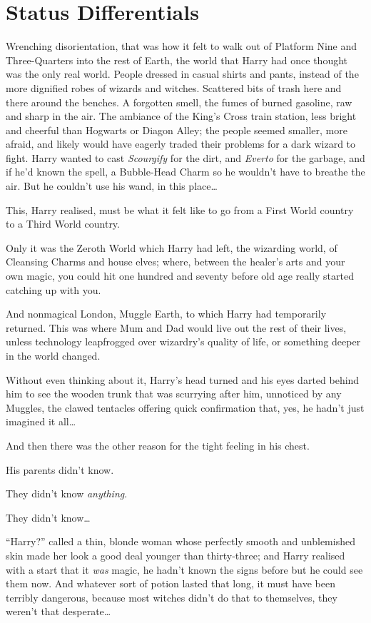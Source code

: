\chapter{Status Differentials}

Wrenching disorientation, that was how it felt to walk out of Platform
Nine and Three-Quarters into the rest of Earth, the world that Harry had
once thought was the only real world. People dressed in casual shirts
and pants, instead of the more dignified robes of wizards and witches.
Scattered bits of trash here and there around the benches. A forgotten
smell, the fumes of burned gasoline, raw and sharp in the air. The
ambiance of the King's Cross train station, less bright and cheerful
than Hogwarts or Diagon Alley; the people seemed smaller, more afraid,
and likely would have eagerly traded their problems for a dark wizard to
fight. Harry wanted to cast \emph{Scourgify} for the dirt, and
\emph{Everto} for the garbage, and if he'd known the spell, a
Bubble-Head Charm so he wouldn't have to breathe the air. But he
couldn't use his wand, in this place\ldots{}

This, Harry realised, must be what it felt like to go from a First World
country to a Third World country.

Only it was the Zeroth World which Harry had left, the wizarding world,
of Cleansing Charms and house elves; where, between the healer's arts
and your own magic, you could hit one hundred and seventy before old age
really started catching up with you.

And nonmagical London, Muggle Earth, to which Harry had temporarily
returned. This was where Mum and Dad would live out the rest of their
lives, unless technology leapfrogged over wizardry's quality of life, or
something deeper in the world changed.

Without even thinking about it, Harry's head turned and his eyes darted
behind him to see the wooden trunk that was scurrying after him,
unnoticed by any Muggles, the clawed tentacles offering quick
confirmation that, yes, he hadn't just imagined it all\ldots{}

And then there was the other reason for the tight feeling in his chest.

His parents didn't know.

They didn't know \emph{anything}.

They didn't know\ldots{}

``Harry?'' called a thin, blonde woman whose perfectly smooth and
unblemished skin made her look a good deal younger than thirty-three;
and Harry realised with a start that it \emph{was} magic, he hadn't
known the signs before but he could see them now. And whatever sort of
potion lasted that long, it must have been terribly dangerous, because
most witches didn't do that to themselves, they weren't that
desperate\ldots{}

